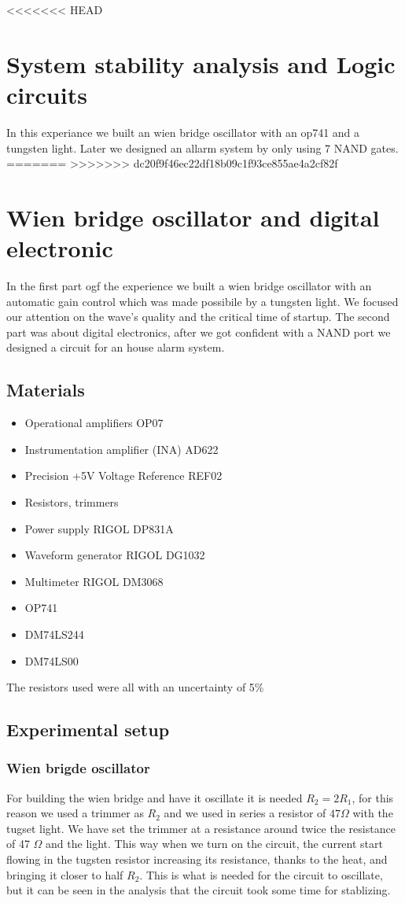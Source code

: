 <<<<<<< HEAD
\chapter{System stability analysis and Logic circuits}
In this experiance we built an wien bridge oscillator with an op741 and a tungsten light. Later we designed an allarm system by only using 7 NAND gates.
=======
>>>>>>> dc20f9f46ec22df18b09c1f93ce855ae4a2cf82f

\chapter{Wien bridge oscillator and digital electronic}
In the first part ogf the experience we built a wien bridge oscillator with an automatic gain control which was made possibile by a tungsten light. We focused our attention on the wave's quality and the critical time of startup. The second part was about digital electronics, after we got confident with a NAND port we designed a circuit for an house alarm system.
\section{Materials}
\begin{itemize}
\item Operational amplifiers OP07
\item Instrumentation amplifier (INA) AD622
\item Precision +5V Voltage Reference REF02
\item Resistors, trimmers
\item Power supply RIGOL DP831A
\item Waveform generator RIGOL DG1032
\item Multimeter RIGOL DM3068
\item OP741
\item DM74LS244
\item DM74LS00
\end{itemize}
The resistors used were all with an uncertainty of 5\%

\section{Experimental setup}
\subsection{Wien brigde oscillator}
For building the wien bridge and have it oscillate it is needed $R_2 = 2 R_1$, for this reason we used a trimmer as $R_2$ and we used in series a resistor of $47 \Omega$ with the tugset light. We have  set the trimmer at a resistance around twice the resistance of 47 $\Omega$ and the light. This way when we turn on the circuit, the current start flowing in the tugsten resistor increasing its resistance, thanks to the heat, and bringing it closer to half $R_2$. This is what is needed for the circuit to oscillate, but it can be seen in the analysis that the circuit took some time for stablizing.

